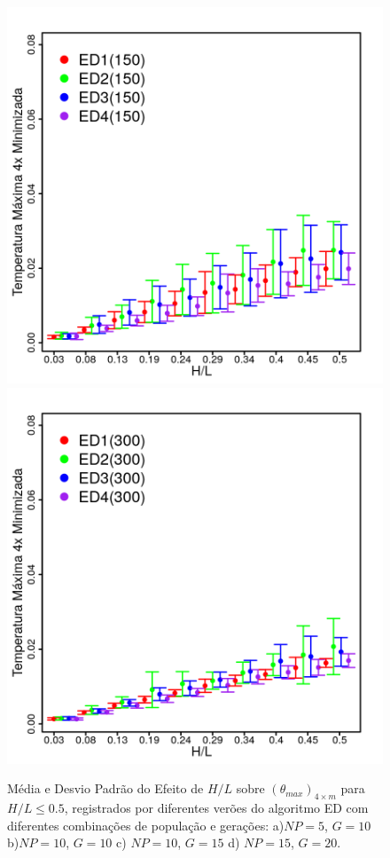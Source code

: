 \documentclass[12pt,A4,A4pt]{article}
\begin{document}
\begin{figure}[!htbp]
\quad
\includegraphics[scale=.91]{imgs/plot_deall150_rdata_std_003-05.png}
\quad
\includegraphics[scale=.91]{imgs/plot_deall300_rdata_std_003-05.png}

\caption{\fontsize{10pt}{\baselineskip}\selectfont Média e Desvio Padrão do Efeito de $H/L$ sobre $({\theta}_{max})_{4\times m}$ para $H/L\leqslant0.5$, registrados por diferentes verões do algoritmo ED com diferentes combinações de população e gerações: a)$NP=5$, $G=10$ b)$NP=10$, $G=10$ c) $NP=10$, $G=15$ d) $NP=15$, $G=20$.}
\label{stddeall}
\end{figure}
\end{document}
